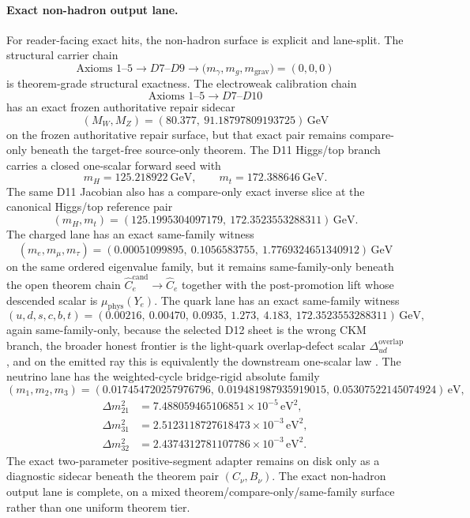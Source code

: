 \documentclass[11pt]{article}
\newcommand{\ophid}[1]{\path{#1}}
\begin{document}
\paragraph{Exact non-hadron output lane.}
For reader-facing exact hits, the non-hadron surface is explicit and lane-split. The structural carrier chain
\[
\text{Axioms }1\text{--}5 \longrightarrow D7\text{--}D9 \longrightarrow
\bigl(m_\gamma,m_g,m_{\mathrm{grav}}\bigr)=(0,0,0)
\]
is theorem-grade structural exactness. The electroweak calibration chain
\[
\text{Axioms }1\text{--}5 \longrightarrow D7\text{--}D10
\]
has an exact frozen authoritative repair sidecar
\[
(M_W,M_Z)=
(80.377,\ 91.18797809193725)\,\mathrm{GeV}
\]
on the frozen authoritative repair surface, but that exact pair remains compare-only beneath the target-free source-only theorem. The D11 Higgs/top branch carries a closed one-scalar forward seed with
\[
m_H=125.218922~\mathrm{GeV},
\qquad
m_t=172.388646~\mathrm{GeV}.
\]
The same D11 Jacobian also has a compare-only exact inverse slice at the canonical Higgs/top reference pair
\[
(m_H,m_t)=
(125.1995304097179,\ 172.3523553288311)\,\mathrm{GeV}.
\]
The charged lane has an exact same-family witness
\[
(m_e,m_\mu,m_\tau)=
(0.00051099895,\ 0.1056583755,\ 1.7769324651340912)\,\mathrm{GeV}
\]
on the same ordered eigenvalue family, but it remains same-family-only beneath the open theorem chain \(\widehat C_e^{\mathrm{cand}}\to \widehat C_e\) together with the post-promotion lift whose descended scalar is \(\mu_{\mathrm{phys}}(Y_e)\). The quark lane has an exact same-family witness
\[
(u,d,s,c,b,t)=
(0.00216,\ 0.00470,\ 0.0935,\ 1.273,\ 4.183,\ 172.3523553288311)\,\mathrm{GeV},
\]
again same-family-only, because the selected D12 sheet is the wrong CKM branch, the broader honest frontier is the light-quark overlap-defect scalar \(\Delta_{ud}^{\mathrm{overlap}}\), and on the emitted ray this is equivalently the downstream one-scalar law \ophid{quark_d12_t1_value_law}. The neutrino lane has the weighted-cycle bridge-rigid absolute family
\[
(m_1,m_2,m_3)=
(0.017454720257976796,\ 0.019481987935919015,\ 0.05307522145074924)\,\mathrm{eV},
\]
\[
\begin{aligned}
\Delta m_{21}^2&=7.488059465106851\times10^{-5}\,\mathrm{eV}^2,\\
\Delta m_{31}^2&=2.5123118727618473\times10^{-3}\,\mathrm{eV}^2,\\
\Delta m_{32}^2&=2.4374312781107786\times10^{-3}\,\mathrm{eV}^2.
\end{aligned}
\]
The exact two-parameter positive-segment adapter remains on disk only as a diagnostic sidecar beneath the theorem pair \((C_\nu,B_\nu)\). The exact non-hadron output lane is complete, on a mixed theorem/compare-only/same-family surface rather than one uniform theorem tier.
\end{document}

